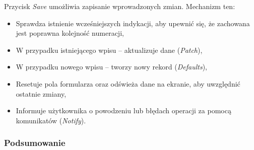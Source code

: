 Przycisk \textit{Save} umożliwia zapisanie wprowadzonych zmian. Mechanizm ten:
\begin{itemize}
    \item Sprawdza istnienie wcześniejszych indykacji, aby upewnić się, że zachowana jest poprawna kolejność numeracji,
    \item W przypadku istniejącego wpisu -- aktualizuje dane (\textit{Patch}),
    \item W przypadku nowego wpisu -- tworzy nowy rekord (\textit{Defaults}),
    \item Resetuje pola formularza oraz odświeża dane na ekranie, aby uwzględnić ostatnie zmiany,
    \item Informuje użytkownika o powodzeniu lub błędach operacji za pomocą komunikatów (\textit{Notify}).
\end{itemize}

\subsubsection{Podsumowanie}
